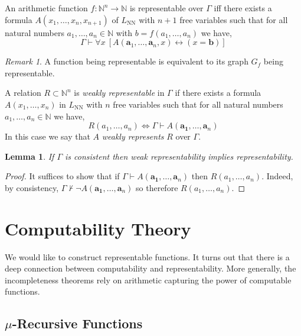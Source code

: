 \documentclass[12pt, leqno]{article}
\newcommand{\N}{\mathbb{N}}
\renewcommand{\bf}[1]{\mathbf{#1}}
\newcommand{\proves}{\vdash}
\newcommand{\uq}[1]{\forall{#1} \:}
\newenvironment{definition}[1][Definition:]{\begin{trivlist}
\item[\hskip \labelsep {\bfseries #1}]}{\end{trivlist}}
\theoremstyle{theorem}
\newtheorem{lemma}[theorem]{Lemma}
\theoremstyle{definition}
\theoremstyle{definition}
\theoremstyle{remark}
\theoremstyle{definition}
\theoremstyle{remark}
\newtheorem{remark}{Remark}[subsection]
\begin{document}
\begin{definition}
An arithmetic function $f : \N^n \to \N$ is representable over $\Gamma$ iff there exists a formula $A(x_1, \dots, x_n, x_{n+1})$ of $L_{\text{NN}}$ with $n+1$ free variables such that for all natural numbers $a_1, \dots, a_n \in \N$ with $b = f(a_1, \dots, a_n)$ we have,
\[ \Gamma \proves \uq{x} [A(\bf{a}_1, \dots, \bf{a}_n, x) \leftrightarrow (x = \bf{b})] \]
\end{definition}

\begin{remark}
A function being representable is equivalent to its graph $G_f$ being representable. 
\end{remark}

\begin{definition}
A relation $R \subset \N^n$ is \textit{weakly representable} in $\Gamma$ if there exists a formula $A(x_1, \dots, x_n)$ in $L_{\text{NN}}$ with $n$ free variables such that for all natural numbers $a_1, \dots, a_n \in \N$ we have,
\[
R(a_1, \dots, a_n) \iff \Gamma \proves A(\bf{a_1}, \dots, \bf{a}_n)
\]
In this case we say that $A$ \textit{weakly represents} $R$ over $\Gamma$.
\end{definition}

\begin{lemma}
If $\Gamma$ is consistent then weak representability implies representability.
\end{lemma}

\begin{proof}
It suffices to show that if $\Gamma \proves A(\bf{a_1}, \dots, \bf{a}_n)$ then $R(a_1, \dots, a_n)$. Indeed, by consistency, $\Gamma \not\proves \neg A(\bf{a_1}, \dots, \bf{a}_n)$ so therefore $R(a_1, \dots, a_n)$.
\end{proof}


\section{Computability Theory}

We would like to construct representable functions. It turns out that there is a deep connection between computability and  representability. More generally, the incompleteness theorems rely on arithmetic capturing the power of computable functions. 

\subsection{$\mu$-Recursive Functions}
\end{document}
